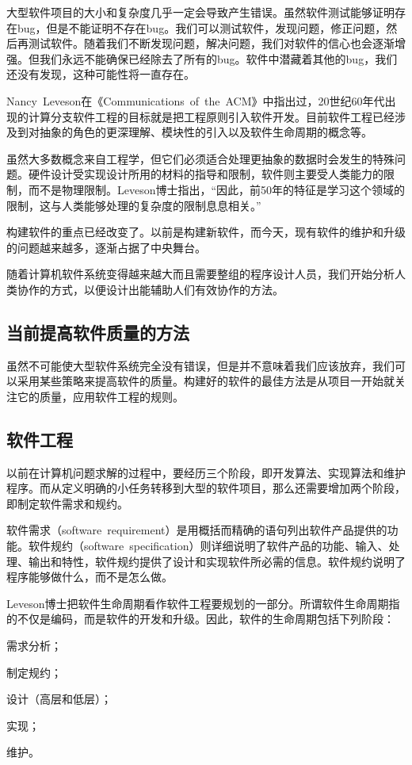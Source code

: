 大型软件项目的大小和复杂度几乎一定会导致产生错误。虽然软件测试能够证明存在bug，但是不能证明不存在bug。我们可以测试软件，发现问题，修正问题，然后再测试软件。随着我们不断发现问题，解决问题，我们对软件的信心也会逐渐增强。但我们永远不能确保已经除去了所有的bug。软件中潜藏着其他的bug，我们还没有发现，这种可能性将一直存在。

Nancy~Leveson在《Communications~of~the~ACM》中指出过，20世纪60年代出现的计算分支软件工程的目标就是把工程原则引入软件开发。目前软件工程已经涉及到对抽象的角色的更深理解、模块性的引入以及软件生命周期的概念等。

虽然大多数概念来自工程学，但它们必须适合处理更抽象的数据时会发生的特殊问题。硬件设计受实现设计所用的材料的指导和限制，软件则主要受人类能力的限制，而不是物理限制。Leveson博士指出，“因此，前50年的特征是学习这个领域的限制，这与人类能够处理的复杂度的限制息息相关。”

构建软件的重点已经改变了。以前是构建新软件，而今天，现有软件的维护和升级的问题越来越多，逐渐占据了中央舞台。

随着计算机软件系统变得越来越大而且需要整组的程序设计人员，我们开始分析人类协作的方式，以便设计出能辅助人们有效协作的方法。

\subsection{当前提高软件质量的方法}

虽然不可能使大型软件系统完全没有错误，但是并不意味着我们应该放弃，我们可以采用某些策略来提高软件的质量。构建好的软件的最佳方法是从项目一开始就关注它的质量，应用软件工程的规则。


\subsection{软件工程}

以前在计算机问题求解的过程中，要经历三个阶段，即开发算法、实现算法和维护程序。而从定义明确的小任务转移到大型的软件项目，那么还需要增加两个阶段，即制定软件需求和规约。

软件需求（software~requirement）是用概括而精确的语句列出软件产品提供的功能。软件规约（software~specification）则详细说明了软件产品的功能、输入、处理、输出和特性，软件规约提供了设计和实现软件所必需的信息。软件规约说明了程序能够做什么，而不是怎么做。

Leveson博士把软件生命周期看作软件工程要规划的一部分。所谓软件生命周期指的不仅是编码，而是软件的开发和升级。因此，软件的生命周期包括下列阶段：
\begin{compactitem}
\item 需求分析；
\item 制定规约；
\item 设计（高层和低层）；
\item 实现；
\item 维护。
\end{compactitem}

